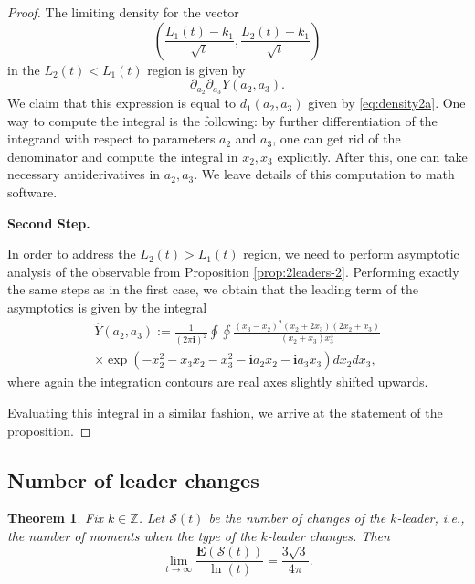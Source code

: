 \documentclass[11pt,reqno]{amsart}
\newtheorem{thm}{Theorem}[section]
\theoremstyle{definition}
\theoremstyle{remark}
\theoremstyle{remark}
\def\Z{\mathbb Z}
\newcommand{\ii}{{\mathbf i}}
\numberwithin{equation}{section}
\begin{document}
\begin{proof}
		The limiting density for the vector 
		$$
		\left( \frac{L_1(t) - k_1}{\sqrt{t}}, \frac{L_2(t) - k_1}{\sqrt{t}} \right)
		$$
		in the $L_2 (t) < L_1(t)$ region is given by
		$$
		\partial_{a_2} \partial_{a_3} Y(a_2,a_3).
		$$
		We claim that this expression is equal to $d_1(a_2,a_3)$ given by \eqref{eq:density2a}. One way to compute the integral is the following: by further differentiation of the integrand with respect to parameters $a_2$ and $a_3$, one can get rid of the denominator and compute the integral in $x_2, x_3$ explicitly. After this, one can take necessary antiderivatives in $a_2, a_3$. We leave details of this computation to math software.
		
		\smallskip
		
		\textbf{Second Step.}
		
		\smallskip
		
		In order to address the $L_2 (t) > L_1(t)$ region, we need to perform asymptotic analysis of the observable from Proposition \ref{prop:2leaders-2}. Performing exactly the same steps as in the first case, we obtain that the leading term of the asymptotics is given by the integral
		\begin{multline*}
			\hat Y (a_2,a_3) := \frac{1}{(2 \pi \ii)^2} \oint \oint \frac{(x_3-x_2)^2 (x_2 + 2 x_3)(2 x_2 + x_3)}{ (x_2 + x_3) x_3^3 } \\ \times \exp \left( - x_2^2 - x_3 x_2 - x_3^2 - \ii a_2 x_2 - \ii a_3 x_3 \right) d x_2 d x_3,
		\end{multline*}
		where again the integration contours are real axes slightly shifted upwards. 
		
		Evaluating this integral in a similar fashion, we arrive at the statement of the proposition. 
		
	\end{proof}
	
	\subsection{Number of leader changes}
	
	\begin{thm}
		\label{th:leader-changes}
		Fix $k \in \Z$. Let $\mathcal{S}(t)$ be the number of changes of the $k$-leader, i.e., the number of moments when the type of the $k$-leader changes. Then
		$$
		\lim_{t \to \infty} \frac{ \mathbf{E} \left( \mathcal{S}(t) \right)}{\ln(t)} = \frac{3 \sqrt{3}}{4 \pi}.
		$$
	\end{thm}
	
\end{document}
